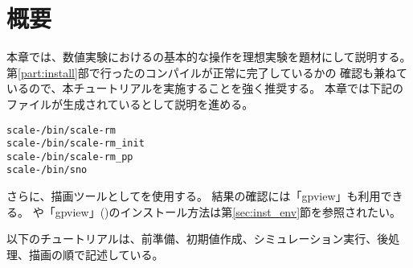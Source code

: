 \section{概要} \label{sec:ideal_exp_intro}

本章では、数値実験における{\scalerm}の基本的な操作を理想実験を題材にして説明する。
第\ref{part:install}部で行った{\scalelib}のコンパイルが正常に完了しているかの
確認も兼ねているので、本チュートリアルを実施することを強く推奨する。
本章では下記のファイルが生成されているとして説明を進める。
\begin{alltt}
  scale-{\version}/bin/scale-rm
  scale-{\version}/bin/scale-rm_init
  scale-{\version}/bin/scale-rm_pp
  scale-{\version}/bin/sno
\end{alltt}
さらに、描画ツールとして\grads を使用する。
結果の確認には「gpview」も利用できる。
\grads や「gpview」(\gphys)のインストール方法は第\ref{sec:inst_env}節を参照されたい。

以下のチュートリアルは、前準備、初期値作成、シミュレーション実行、後処理、描画の順で記述している。
